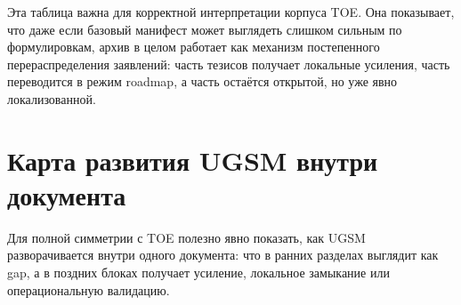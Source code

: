 \documentclass[12pt,a4paper]{article}
\begin{document}
Эта таблица важна для корректной интерпретации корпуса TOE. Она показывает, что даже если базовый манифест может выглядеть слишком сильным по формулировкам, архив в целом работает как механизм постепенного перераспределения заявлений: часть тезисов получает локальные усиления, часть переводится в режим roadmap, а часть остаётся открытой, но уже явно локализованной.



\section{Карта развития UGSM внутри документа}

Для полной симметрии с TOE полезно явно показать, как UGSM разворачивается внутри одного документа: что в ранних разделах выглядит как gap, а в поздних блоках получает усиление, локальное замыкание или операциональную валидацию.
\end{document}
